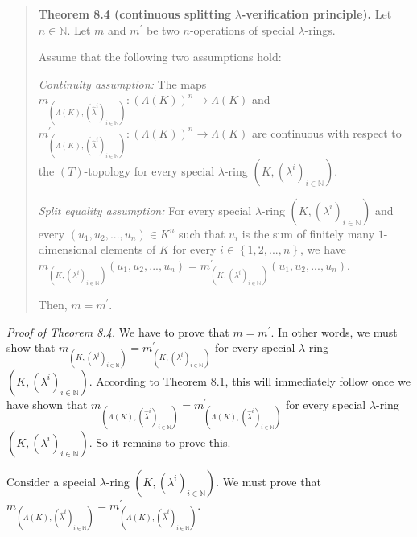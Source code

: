 \documentclass[numbers=enddot,12pt,final,onecolumn,notitlepage]{scrartcl}%
\begin{document}
\begin{quote}
\textbf{Theorem 8.4 (continuous splitting }$\lambda$\textbf{-verification
principle).} Let $n\in\mathbb{N}$. Let $m$ and $m^{\prime}$ be two
$n$-operations of special $\lambda$-rings.

Assume that the following two assumptions hold:

\textit{Continuity assumption:} The maps $m_{\left(  \Lambda\left(  K\right)
,\left(  \widehat{\lambda}^{i}\right)  _{i\in\mathbb{N}}\right)  }:\left(
\Lambda\left(  K\right)  \right)  ^{n}\rightarrow\Lambda\left(  K\right)  $
and $m_{\left(  \Lambda\left(  K\right)  ,\left(  \widehat{\lambda}%
^{i}\right)  _{i\in\mathbb{N}}\right)  }^{\prime}:\left(  \Lambda\left(
K\right)  \right)  ^{n}\rightarrow\Lambda\left(  K\right)  $ are continuous
with respect to the $\left(  T\right)  $-topology for every special $\lambda
$-ring $\left(  K,\left(  \lambda^{i}\right)  _{i\in\mathbb{N}}\right)  $.

\textit{Split equality assumption:} For every special $\lambda$-ring $\left(
K,\left(  \lambda^{i}\right)  _{i\in\mathbb{N}}\right)  $ and every $\left(
u_{1},u_{2},...,u_{n}\right)  \in K^{n}$ such that $u_{i}$ is the sum of
finitely many $1$-dimensional elements of $K$ for every $i\in\left\{
1,2,...,n\right\}  $, we have $m_{\left(  K,\left(  \lambda^{i}\right)
_{i\in\mathbb{N}}\right)  }\left(  u_{1},u_{2},...,u_{n}\right)  =m_{\left(
K,\left(  \lambda^{i}\right)  _{i\in\mathbb{N}}\right)  }^{\prime}\left(
u_{1},u_{2},...,u_{n}\right)  $.

Then, $m=m^{\prime}$.
\end{quote}

\textit{Proof of Theorem 8.4.} We have to prove that $m=m^{\prime}$. In other
words, we must show that $m_{\left(  K,\left(  \lambda^{i}\right)
_{i\in\mathbb{N}}\right)  }=m_{\left(  K,\left(  \lambda^{i}\right)
_{i\in\mathbb{N}}\right)  }^{\prime}$ for every special $\lambda$-ring
$\left(  K,\left(  \lambda^{i}\right)  _{i\in\mathbb{N}}\right)  $. According
to Theorem 8.1, this will immediately follow once we have shown that
$m_{\left(  \Lambda\left(  K\right)  ,\left(  \widehat{\lambda}^{i}\right)
_{i\in\mathbb{N}}\right)  }=m_{\left(  \Lambda\left(  K\right)  ,\left(
\widehat{\lambda}^{i}\right)  _{i\in\mathbb{N}}\right)  }^{\prime}$ for every
special $\lambda$-ring $\left(  K,\left(  \lambda^{i}\right)  _{i\in
\mathbb{N}}\right)  $. So it remains to prove this.

Consider a special $\lambda$-ring $\left(  K,\left(  \lambda^{i}\right)
_{i\in\mathbb{N}}\right)  $. We must prove that $m_{\left(  \Lambda\left(
K\right)  ,\left(  \widehat{\lambda}^{i}\right)  _{i\in\mathbb{N}}\right)
}=m_{\left(  \Lambda\left(  K\right)  ,\left(  \widehat{\lambda}^{i}\right)
_{i\in\mathbb{N}}\right)  }^{\prime}$.
\end{document}
